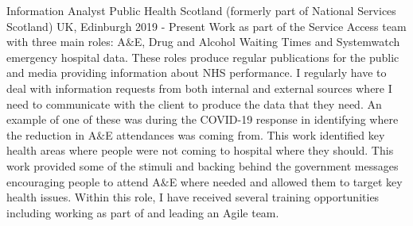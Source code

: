 \begin{cventries}

\end{cventries}





\begin{cventries}

    
 \cventry
    {Information Analyst} %
    {Public Health Scotland (formerly part of National Services Scotland)} %
    {UK, Edinburgh} %
    {2019 - Present} %
    {
    Work as part of the Service Access team with three main roles: A$\&$E, Drug and Alcohol Waiting Times and Systemwatch emergency hospital data. These roles produce regular publications for the public and media providing information about NHS performance. I regularly have to deal with information requests from both internal and external sources where I need to communicate with the client to produce the data that they need. An example of one of these was during the COVID-19 response in identifying where the reduction in A$\&$E attendances was coming from. This work identified key health areas where people were not coming to hospital where they should. This work provided some of the stimuli and backing behind the government messages encouraging people to attend A$\&$E where needed and allowed them to target key health issues.\newline
    Within this role, I have received several training opportunities including working as part of and leading an Agile team.
    }
    


\end{cventries}
